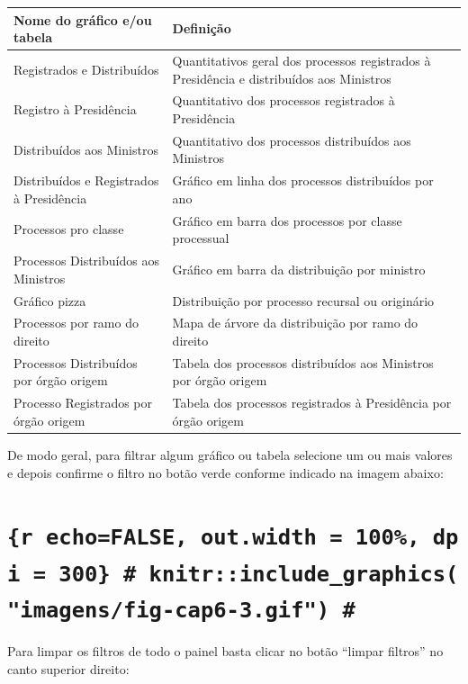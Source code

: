 \documentclass[
]{book}
\begin{document}
\begin{tabular}{l|l}
\hline
Nome do gráfico e/ou tabela & Definição\\
\hline
Registrados e Distribuídos & Quantitativos geral dos processos registrados à Presidência e distribuídos aos Ministros\\
\hline
Registro à Presidência & Quantitativo dos processos registrados à Presidência\\
\hline
Distribuídos aos Ministros & Quantitativo dos processos distribuídos aos Ministros\\
\hline
Distribuídos e Registrados à Presidência & Gráfico em linha dos processos distribuídos por ano\\
\hline
Processos pro classe & Gráfico em barra dos processos por classe processual\\
\hline
Processos Distribuídos aos Ministros & Gráfico em barra da distribuição por ministro\\
\hline
Gráfico pizza & Distribuição por processo recursal ou originário\\
\hline
Processos por ramo do direito & Mapa de árvore da distribuição por ramo do direito\\
\hline
Processos Distribuídos por órgão origem & Tabela dos processos distribuídos aos Ministros por órgão origem\\
\hline
Processo Registrados por órgão origem & Tabela dos processos registrados à Presidência por órgão origem\\
\hline
\end{tabular}

De modo geral, para filtrar algum gráfico ou tabela selecione um ou mais valores e depois confirme o filtro no botão verde conforme indicado na imagem abaixo:

\hypertarget{r-echofalse-out.width-100-dpi-300-knitrinclude_graphicsimagensfig-cap6-3.gif}{%
\chapter{\texorpdfstring{\texttt{\{r\ echo=FALSE,\ out.width\ =\ \textquotesingle{}100\%\textquotesingle{},\ dpi\ =\ 300\}\ \#\ knitr::include\_graphics("imagens/fig-cap6-3.gif")\ \#}}{\{r echo=FALSE, out.width = '100\%', dpi = 300\} \# knitr::include\_graphics("imagens/fig-cap6-3.gif") \#}}\label{r-echofalse-out.width-100-dpi-300-knitrinclude_graphicsimagensfig-cap6-3.gif}}

Para limpar os filtros de todo o painel basta clicar no botão ``limpar filtros'' no canto superior direito:
\end{document}
